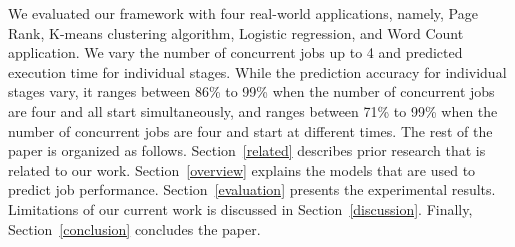 \noindent
We evaluated our framework with four real-world applications, namely, Page Rank, K-means clustering algorithm, Logistic regression, and Word Count application. We vary the number of concurrent jobs up to 4 and predicted execution time for individual stages. While the prediction accuracy for individual stages vary, it ranges between 86\% to 99\% when the number of concurrent jobs are four and all start simultaneously, and ranges between 71\% to 99\% when the number of concurrent jobs are four and start at different times. 
\noindent
The rest of the paper is organized as follows. Section~\ref{related} describes prior research that is related to our work. Section~\ref{overview} explains the models that are used to predict job performance. Section~\ref{evaluation} presents the experimental results. Limitations of our current work is discussed in Section~\ref{discussion}. Finally, Section~\ref{conclusion} concludes the paper.


